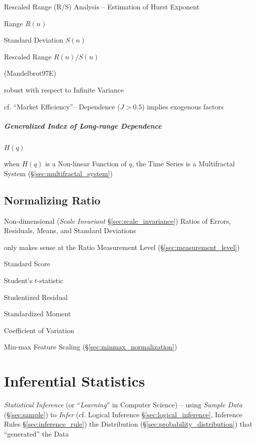 Rescaled Range (R/S) Analysis -- Estimation of Hurst Exponent

Range $R(n)$

Standard Deviation $S(n)$

Rescaled Range $R(n) / S(n)$

(Mandelbrot97E)

robust with respect to Infinite Variance

cf. ``Market Efficiency''-- Dependence ($J > 0.5$) implies exogenous factors



\subparagraph{Generalized Index of Long-range Dependence}
\label{sec:generalized_hurst}\hfill

$H(q)$

when $H(q)$ is a Non-linear Function of $q$, the Time Series is a Multifractal
System (\S\ref{sec:multifractal_system})



\subsection{Normalizing Ratio}\label{sec:normalizing_ratio}

Non-dimensional (\emph{Scale Invariant} \S\ref{sec:scale_invariance}) Ratios of
Errors, Residuals, Means, and Standard Deviations

only makes sense at the Ratio Measurement Level (\S\ref{sec:measurement_level})

Standard Score

Student's $t$-statistic

Studentized Residual

Standardized Moment

Coefficient of Variation

Min-max Feature Scaling (\S\ref{sec:minmax_normalization})



\section{Inferential Statistics}\label{sec:inferential_statistics}

\emph{Statistical Inference} (or ``\emph{Learning}'' in Computer Science) --
using \emph{Sample Data} (\S\ref{sec:sample}) to \emph{Infer} (cf. Logical
Inference \S\ref{sec:logical_inference}, Inference Rules
\S\ref{sec:inference_rule}) the Distribution
(\S\ref{sec:probability_distribution}) that ``generated'' the Data

